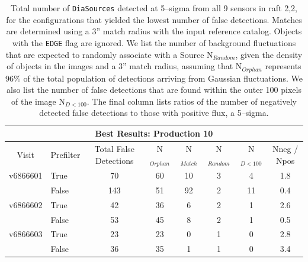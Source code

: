 \documentclass[prd, nofootinbib, floatfix, 11pt,tightenlines,times]{article}
\begin{document}
\begin{table}
\centering
\begin{tabular}{clcccccc}
\hline
\multicolumn{8}{|c|}{Best Results: Production 10} \\
\hline
Visit    & Prefilter & Total False Detections &  N$_{Orphan}$ & N$_{Match}$ & N$_{Random}$ & N$_{D<100}$ & Nneg / Npos \\
\hline
v6866601 & True      & 70      &60         & 10 & 3     & 4   & 1.8 \\ 
         & False     & 143     &51         & 92 & 2     & 11  & 0.4 \\
v6866602 & True      & 42      &36         & 6  & 2     & 1   & 2.6 \\
         & False     & 53      &45         & 8  & 2     & 1   & 0.5 \\
v6866603 & True      & 23      &23         & 0  & 1     & 0   & 2.8 \\
         & False     & 36      &35         & 1  & 1     & 0   & 3.4 \\
\end{tabular}
\caption{Total number of {\tt DiaSources} detected at 5--sigma from
  all 9 sensors in raft 2,2, for the configurations that yielded the
  lowest number of false detections.  Matches are determined using a
  3'' match radius with the input reference catalog.  Objects with the
  {\tt EDGE} flag are ignored.  We list the number of background
  fluctuations that are expected to randomly associate with a Source
  N$_{Random}$, given the density of objects in the images and a 3''
  match radius, assuming that N$_{Orphan}$ represents 96\% of the
  total population of detections arriving from Gaussian fluctuations.
  We also list the number of false detections that are found within
  the outer 100 pixels of the image N$_{D<100}$.  The final column
  lists ratios of the number of negatively detected false detections
  to those with positive flux, a 5--sigma. \label{tab-bestfp10a}}
\end{table}
\end{document}
